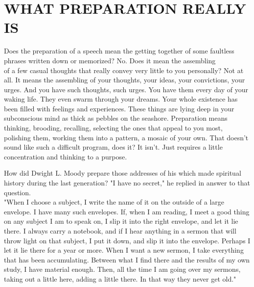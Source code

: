 \documentclass[10pt]{article}
\begin{document}
\section*{WHAT PREPARATION REALLY IS}
Does the preparation of a speech mean the getting together of some faultless phrases written down or memorized? No. Does it mean the assembling\\
of a few casual thoughts that really convey very little to you personally? Not at all. It means the assembling of your thoughts, your ideas, your convictions, your urges. And you have such thoughts, such urges. You have them every day of your waking life. They even swarm through your dreams. Your whole existence has been filled with feelings and experiences. These things are lying deep in your subconscious mind as thick as pebbles on the seashore. Preparation means thinking, brooding, recalling, selecting the ones that appeal to you most, polishing them, working them into a pattern, a mosaic of your own. That doesn't sound like such a difficult program, does it? It isn't. Just requires a little concentration and thinking to a purpose.

How did Dwight L. Moody prepare those addresses of his which made spiritual history during the last generation? "I have no secret," he replied in answer to that question.\\
"When I choose a subject, I write the name of it on the outside of a large envelope. I have many such envelopes. If, when I am reading, I meet a good thing on any subject I am to speak on, I slip it into the right envelope, and let it lie there. I always carry a notebook, and if I hear anything in a sermon that will throw light on that subject, I put it down, and slip it into the envelope. Perhaps I let it lie there for a year or more. When I want a new sermon, I take everything that has been accumulating. Between what I find there and the results of my own study, I have material enough. Then, all the time I am going over my sermons, taking out a little here, adding a little there. In that way they never get old."
\end{document}
